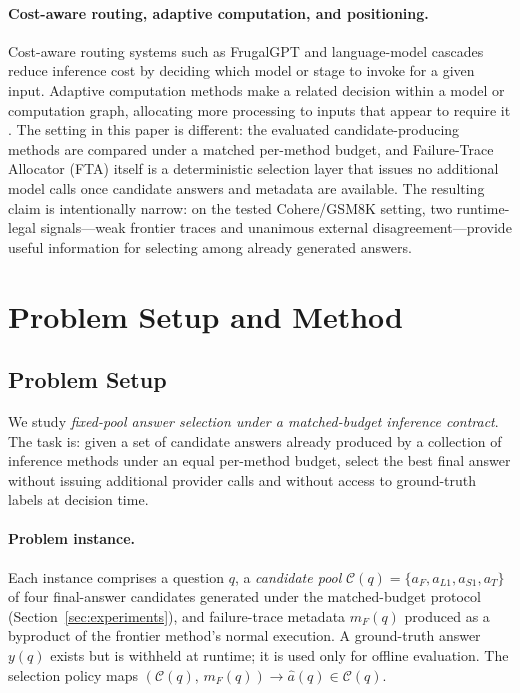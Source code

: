 \documentclass[smallcondensed]{svjour3}
\begin{document}
\paragraph{Cost-aware routing, adaptive computation, and positioning.}
Cost-aware routing systems such as FrugalGPT \citep{chen2023frugalgpt} and language-model cascades \citep{dohan2022language} reduce inference cost by deciding which model or stage to invoke for a given input.
Adaptive computation methods make a related decision within a model or computation graph, allocating more processing to inputs that appear to require it \citep{graves2016adaptive}.
The setting in this paper is different: the evaluated candidate-producing methods are compared under a matched per-method budget, and Failure-Trace Allocator (FTA) itself is a deterministic selection layer that issues no additional model calls once candidate answers and metadata are available.
The resulting claim is intentionally narrow: on the tested Cohere/GSM8K setting, two runtime-legal signals---weak frontier traces and unanimous external disagreement---provide useful information for selecting among already generated answers.

\section{Problem Setup and Method}
\label{sec:problem_setup_method}

\subsection{Problem Setup}
\label{sec:problem_setup}

We study \emph{fixed-pool answer selection under a matched-budget inference
contract}.
The task is: given a set of candidate answers already produced by a collection
of inference methods under an equal per-method budget, select the best final
answer without issuing additional provider calls and without access to
ground-truth labels at decision time.

\paragraph{Problem instance.}
Each instance comprises a question $q$, a \emph{candidate pool}
$\mathcal{C}(q) = \{a_F, a_{L1}, a_{S1}, a_{T}\}$ of four final-answer
candidates generated under the matched-budget protocol
(Section~\ref{sec:experiments}), and failure-trace metadata $m_F(q)$ produced
as a byproduct of the frontier method's normal execution.
A ground-truth answer $y(q)$ exists but is withheld at runtime; it is used only
for offline evaluation.
The selection policy maps $(\mathcal{C}(q),\, m_F(q)) \to \hat{a}(q) \in
\mathcal{C}(q)$.
\end{document}
